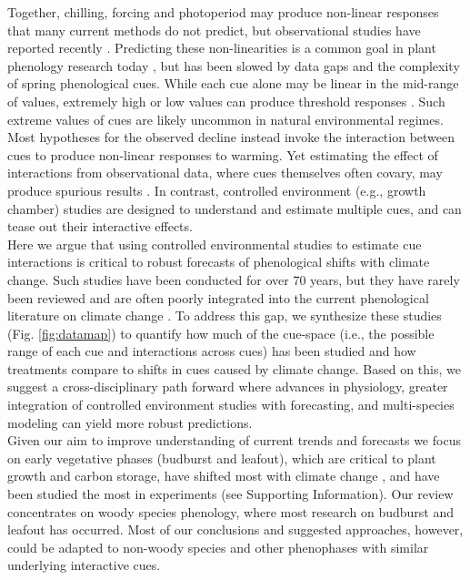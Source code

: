 \documentclass[11pt,letter]{article}
\begin{document}
Together, chilling, forcing and photoperiod may produce non-linear responses that many current methods do not predict, but observational studies have reported recently \citep{fu2015}. Predicting these non-linearities is a common goal in plant phenology research today \citep{gusewell2017,martlusch2017,gauzere2019,chen2019,keenan2019}, but has been slowed by data gaps and the complexity of spring phenological cues. While each cue alone may be linear in the mid-range of values, extremely high or low values can produce threshold responses \citep{major1980,Heide:1993,Partanen:1998aa,Singh:2017,rinne2018}. Such extreme values of cues are likely uncommon in natural environmental regimes. Most hypotheses for the observed decline instead invoke the interaction between cues to produce non-linear responses to warming. Yet estimating the effect of interactions from observational data, where cues themselves often covary, may produce spurious results \citep{ettinger2020}. In contrast, controlled environment (e.g., growth chamber) studies are designed to understand and estimate multiple cues, and can tease out their interactive effects. \\ %

Here we argue that using controlled environmental studies to estimate cue interactions is critical to robust forecasts of phenological shifts with climate change. Such studies have been conducted for over 70 years, but they have rarely been reviewed and are often poorly integrated into the current phenological literature on climate change \citep[e.g.,][]{fu2015,richardson2018}. To address this gap, we synthesize these studies (Fig. \ref{fig:datamap}) to quantify how much of the cue-space (i.e., the possible range of each cue and interactions across cues) has been studied and how treatments compare to shifts in cues caused by climate change. Based on this, we suggest a cross-disciplinary path forward where advances in physiology, greater integration of controlled environment studies with forecasting, and multi-species modeling can yield more robust predictions.\\

Given our aim to improve understanding of current trends and forecasts we focus on early vegetative phases (budburst and leafout), which are critical to plant growth and carbon storage, have shifted most with climate change \citep{Cleland:2007or,IPCC:2014sm}, and have been studied the most in experiments (see Supporting Information). Our review concentrates on woody species phenology, where most research on budburst and leafout has occurred. Most of our conclusions and suggested approaches, however, could be adapted to non-woody species and other phenophases with similar underlying interactive cues.
\end{document}
